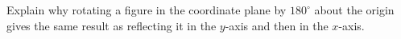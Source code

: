 Explain why rotating a figure in the coordinate plane by $180^\circ$ about the origin gives the same result as reflecting it in the $y$-axis and then in the $x$-axis.
